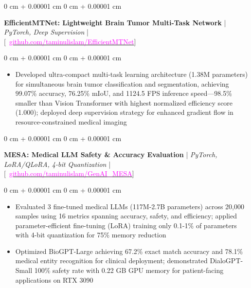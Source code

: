 \documentclass[9pt, letterpaper]{article}
\newenvironment{highlights}{
    \begin{itemize}[
        topsep=0.05 cm,
        parsep=0.05 cm,
        partopsep=0pt,
        itemsep=0pt,
        leftmargin=0 cm + 10pt
    ]
}{
    \end{itemize}
} %
\newenvironment{onecolentry}{
    \begin{adjustwidth}{
        0 cm + 0.00001 cm
    }{
        0 cm + 0.00001 cm
    }
}{
    \end{adjustwidth}
} %
\begin{document}
\begin{onecolentry}
    \textbf{EfficientMTNet: Lightweight Brain Tumor Multi-Task Network} | \textit{PyTorch, Deep Supervision} | \\
    {[\small \faGithub\ \href{https://github.com/taminulislam/EfficientMTNet}{\textcolor{magenta}{github.com/taminulislam/EfficientMTNet}}]}
\end{onecolentry}
\vspace{0.05 cm}
\begin{onecolentry}
    \begin{highlights}
        \item Developed ultra-compact multi-task learning architecture (1.38M parameters) for simultaneous brain tumor classification and segmentation, achieving 99.07\% accuracy, 76.25\% mIoU, and 1124.5 FPS inference speed—98.5\% smaller than Vision Transformer with highest normalized efficiency score (1.000); deployed deep supervision strategy for enhanced gradient flow in resource-constrained medical imaging
    \end{highlights}
\end{onecolentry}
\vspace{0.1 cm}

\begin{onecolentry}
    \textbf{MESA: Medical LLM Safety \& Accuracy Evaluation} | \textit{PyTorch, LoRA/QLoRA, 4-bit Quantization} |\\
    {[\small \faGithub\ \href{https://github.com/taminulislam/GenAI_MESA}{\textcolor{magenta}{github.com/taminulislam/GenAI\_MESA}}]}
\end{onecolentry}
\vspace{0.05 cm}
\begin{onecolentry}
    \begin{highlights}
        \item Evaluated 3 fine-tuned medical LLMs (117M-2.7B parameters) across 20,000 samples using 16 metrics spanning accuracy, safety, and efficiency; applied parameter-efficient fine-tuning (LoRA) training only 0.1-1\% of parameters with 4-bit quantization for 75\% memory reduction

        \item Optimized BioGPT-Large achieving 67.2\% exact match accuracy and 78.1\% medical entity recognition for clinical deployment; demonstrated DialoGPT-Small 100\% safety rate with 0.22 GB GPU memory for patient-facing applications on RTX 3090
    \end{highlights}
\end{onecolentry}
\vspace{0.1 cm}
\end{document}
